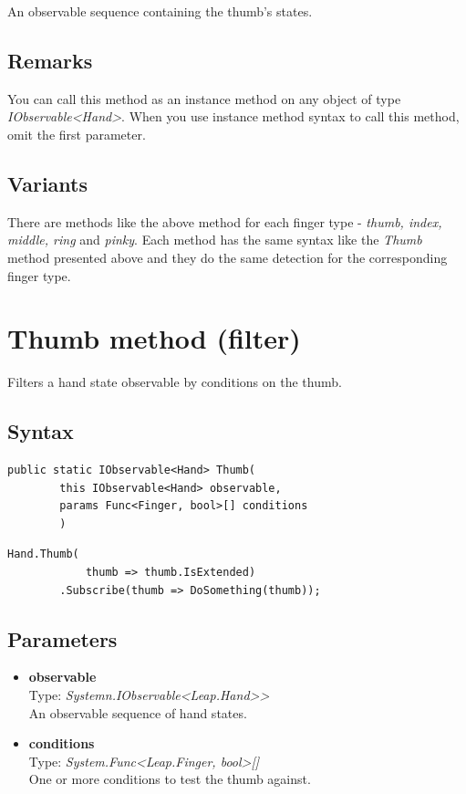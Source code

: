 \documentclass[12pt,a4paper,twoside]{report}
\begin{document}
An observable sequence containing the thumb's states.

\subsection{Remarks}
You can call this method as an instance method on any object of type \textit{IObservable<Hand>}. When you use 
instance method syntax to call this method, omit the first parameter.

\subsection{Variants}
There are methods like the above method for each finger type - \textit{thumb, index, middle, ring} and \textit{pinky}. Each method has the same syntax like the \textit{Thumb} method presented above and they do the same detection for the corresponding finger type.

\section{Thumb method (filter)}
Filters a hand state observable by conditions on the thumb.

\subsection{Syntax}
\begin{lstlisting}[caption=Declaration]
    public static IObservable<Hand> Thumb(
        this IObservable<Hand> observable,
        params Func<Finger, bool>[] conditions
        )
\end{lstlisting}

\begin{lstlisting}[caption=Usage example]
    Hand.Thumb(
            thumb => thumb.IsExtended)
        .Subscribe(thumb => DoSomething(thumb));
\end{lstlisting}

\subsection{Parameters}

\begin{itemize}
    \item \textbf{observable}\\
        Type: \textit{Systemn.IObservable<Leap.Hand>{}>}\\
        An observable sequence of hand states.
    \item \textbf{conditions}\\
        Type: \textit{System.Func<Leap.Finger, bool>[]}\\
        One or more conditions to test the thumb against.
\end{itemize}
\end{document}
